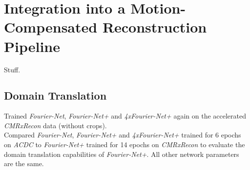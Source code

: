 \documentclass[english,version-2022-01]{uzl-thesis} %
\begin{document}
%


\section{Integration into a Motion-Compensated Reconstruction Pipeline} \label{Sec:ResultsIntegrationMotion-CompensatedReconstructionPipeline}
Stuff.

\subsection{Domain Translation} \label{SubSec:ResultsDomainTranslation}
Trained \emph{Fourier-Net}, \emph{Fourier-Net+} and \emph{4xFourier-Net+} again on the accelerated \emph{CMRxRecon} data (without crops). \\
Compared \emph{Fourier-Net}, \emph{Fourier-Net+} and \emph{4xFourier-Net+} trained for 6 epochs on \emph{ACDC} to \emph{Fourier-Net+} trained for 14 epochs on \emph{CMRxRecon} to evaluate the domain translation capabilities of \emph{Fourier-Net+}. All other network parameters are the same.
\end{document}
